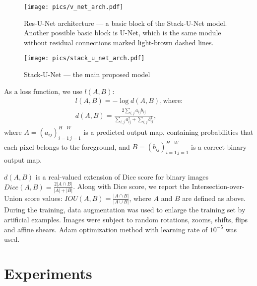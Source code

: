 \documentclass{llncs}
\begin{document}
\begin{figure}[ht!]
	\centering
    \texttt{[image: pics/v\_net\_arch.pdf]}
    \caption{Res-U-Net architecture --- a basic block of the Stack-U-Net model. Another possible basic block is U-Net, which is the same module without residual connections marked light-brown dashed lines.}
    \label{fig:basic_block}
\end{figure}

\begin{figure}[ht!]
	\centering
    \texttt{[image: pics/stack\_u\_net\_arch.pdf]}
    \caption{Stack-U-Net --- the main proposed model}
    \label{fig:stack-u-net}
\end{figure}
  As a loss function, we use $l(A, B)$:
	\begin{gather*}
	l(A, B) = -\log d(A, B), \text{where:}\\
	d(A, B) = \frac{2\sum\limits_{i, j} a_{ij} b_{ij}}
	{\sum\limits_{i, j} a_{ij}^2 + \sum\limits_{i, j} b_{ij}^2},
	\end{gather*}
	where $A = (a_{ij})_{i=1\, j=1}^{H\;\;\;W}$ is a predicted output map, containing probabilities that each pixel belongs to the foreground, and $B = (b_{ij})_{i=1\, j=1}^{H\;\;\;W}$ is a correct binary output map. 
	
$d(A, B)$ is a real-valued extension of Dice score for binary images $Dice(A, B) = \frac{2|A \cap B|}{|A| + |B|}$. Along with Dice score, we report the Intersection-over-Union score values: $IOU(A, B) = \frac{|A \cap B|}{|A \cup B|}$, where $A$ and $B$ are defined as above. During the training, data augmentation was used to enlarge the training set by artificial examples. Images were subject to random rotations, zooms, shifts, flips and affine shears. Adam optimization method with learning rate of $10^{-5}$ was used.

\section{Experiments}
\end{document}
